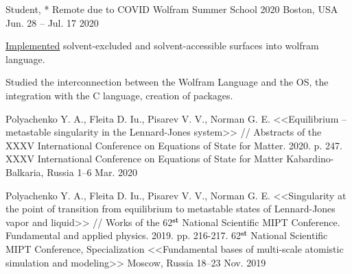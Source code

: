 

\begin{cventries}

  \cventry
    {Student, * Remote due to COVID} %
    {Wolfram Summer School 2020} %
    {Boston, USA} %
    {Jun. 28 -- Jul. 17 2020} %
    {
      \begin{cvitems} %
        \item {\href{https://community.wolfram.com/groups/-/m/t/2029621}{Implemented} solvent-excluded and solvent-accessible surfaces into wolfram language.}      
        \item {Studied the interconnection between the Wolfram Language and the OS, the integration with the C language, creation of packages.}
      \end{cvitems}
    }


  \cventry
    {Polyachenko Y. A., Fleita D. Iu., Pisarev V. V., Norman G. E. <<Equilibrium – metastable singularity in the Lennard-Jones system>> // Abstracts of the XXXV International Conference on Equations of State for Matter. 2020. p. 247.} %
    {XXXV International Conference on Equations of State for Matter} %
    {Kabardino-Balkaria, Russia} %
    {1--6 Mar. 2020} %
    {
      \begin{cvitems} %
      \end{cvitems}
    }


  \cventry
    {Polyachenko Y. A., Fleita D. Iu., Pisarev V. V., Norman G. E. <<Singularity at the point of transition from equilibrium to metastable states of Lennard-Jones vapor and liquid>> // Works of the 62$^{\textbf{st}}$ National Scientific MIPT Conference. Fundamental and applied physics. 2019. pp. 216-217.} %
    {62$^{\textbf{st}}$ National Scientific MIPT Conference, Specialization <<Fundamental bases of multi-scale atomistic simulation and modeling>>} %
    {Moscow, Russia} %
    {18--23 Nov. 2019} %
    {
      \begin{cvitems} %
      \end{cvitems}
    }


\end{cventries}
